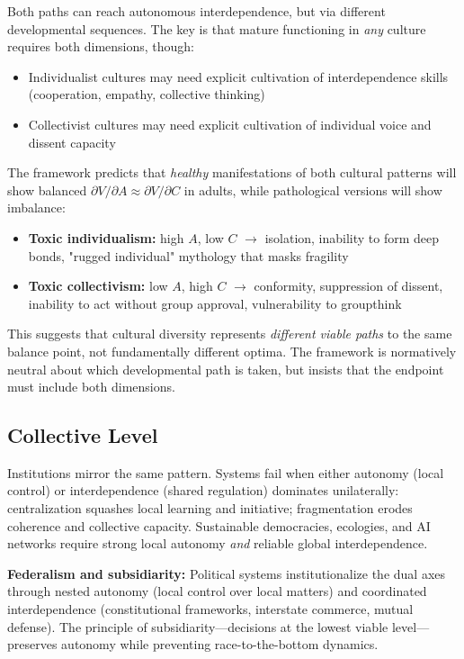 \documentclass[11pt,a4paper]{article}
\begin{document}
Both paths can reach autonomous interdependence, but via different developmental sequences. The key is that mature functioning in \emph{any} culture requires both dimensions, though:
\begin{itemize}
    \item Individualist cultures may need explicit cultivation of interdependence skills (cooperation, empathy, collective thinking)
    \item Collectivist cultures may need explicit cultivation of individual voice and dissent capacity
\end{itemize}

The framework predicts that \emph{healthy} manifestations of both cultural patterns will show balanced $\partial V/\partial A \approx \partial V/\partial C$ in adults, while pathological versions will show imbalance:
\begin{itemize}
    \item \textbf{Toxic individualism:} high $A$, low $C$ $\to$ isolation, inability to form deep bonds, "rugged individual" mythology that masks fragility
    \item \textbf{Toxic collectivism:} low $A$, high $C$ $\to$ conformity, suppression of dissent, inability to act without group approval, vulnerability to groupthink
\end{itemize}

This suggests that cultural diversity represents \emph{different viable paths} to the same balance point, not fundamentally different optima. The framework is normatively neutral about which developmental path is taken, but insists that the endpoint must include both dimensions.

\subsection{Collective Level}

Institutions mirror the same pattern.
Systems fail when either autonomy (local control) or interdependence (shared regulation) dominates unilaterally: centralization squashes local learning and initiative; fragmentation erodes coherence and collective capacity.
Sustainable democracies, ecologies, and AI networks require strong local autonomy \emph{and} reliable global interdependence.

\textbf{Federalism and subsidiarity:} Political systems institutionalize the dual axes through nested autonomy (local control over local matters) and coordinated interdependence (constitutional frameworks, interstate commerce, mutual defense). The principle of subsidiarity---decisions at the lowest viable level---preserves autonomy while preventing race-to-the-bottom dynamics.
\end{document}
